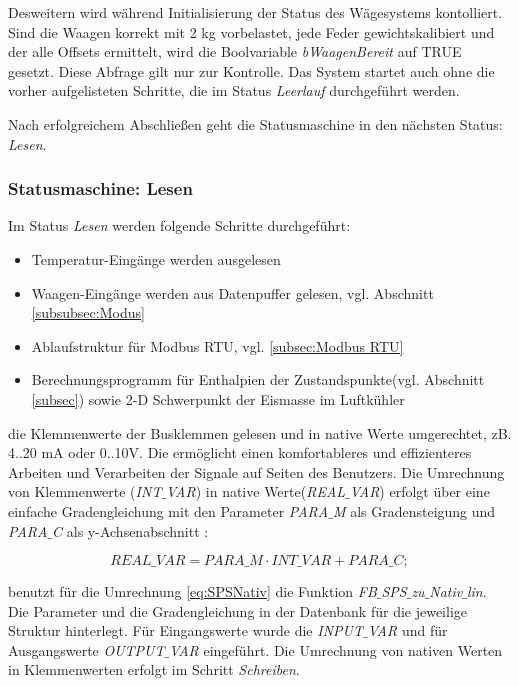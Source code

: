 Desweitern wird während Initialisierung der Status des Wägesystems kontolliert. Sind die Waagen korrekt mit 2 kg vorbelastet, jede Feder gewichtskalibiert und der alle Offsets ermittelt, wird die Boolvariable  \textit{bWaagenBereit} auf TRUE gesetzt. Diese Abfrage gilt nur zur Kontrolle. Das System startet auch ohne die vorher aufgelisteten Schritte, die im Status \textit{Leerlauf} durchgeführt werden. 


Nach erfolgreichem Abschließen geht die Statusmaschine in den nächsten Status: \textit{Lesen}.

\subsubsection*{Statusmaschine: Lesen}

Im Status \textit{Lesen} werden folgende Schritte durchgeführt: 

\begin{itemize}
\item	Temperatur-Eingänge werden ausgelesen
\item	Waagen-Eingänge werden aus Datenpuffer gelesen, vgl. Abschnitt \ref{subsubsec:Modus}
\item	Ablaufstruktur für Modbus RTU, vgl. \ref{subsec:Modbus RTU}
\item 	Berechnungsprogramm für Enthalpien der Zustandspunkte(vgl. Abschnitt \ref{subsec}) sowie 2-D Schwerpunkt der Eismasse im Luftkühler
\end{itemize} 

 die Klemmenwerte der Busklemmen gelesen und in native Werte umgerechtet, zB. 4..20 mA oder 0..10V. Die ermöglicht einen komfortableres und effizienteres Arbeiten und Verarbeiten der Signale auf Seiten des Benutzers. Die Umrechnung von Klemmenwerte (\textit{INT$\_$VAR}) in native Werte(\textit{REAL$\_$VAR}) erfolgt über eine einfache Gradengleichung mit den Parameter \textit{PARA$\_$M} als Gradensteigung und \textit{PARA$\_$C} als y-Achsenabschnitt :

\begin{equation}
REAL\_VAR = PARA\_M\cdot INT\_VAR + PARA\_C; 
\label{eq:SPSNativ}
\end{equation}

\textsc{\citeauthor{Nuerenberg15}}  benutzt für die Umrechnung \ref{eq:SPSNativ} die Funktion \textit{FB$\_$SPS$\_$zu$\_$Nativ$\_$lin}. Die Parameter und die Gradengleichung in der Datenbank für die jeweilige Struktur hinterlegt. Für Eingangswerte wurde die  \textit{INPUT$\_$VAR} und für Ausgangswerte \textit{OUTPUT$\_$VAR} eingeführt. Die Umrechnung von nativen Werten in Klemmenwerten erfolgt im Schritt \textit{Schreiben}.

